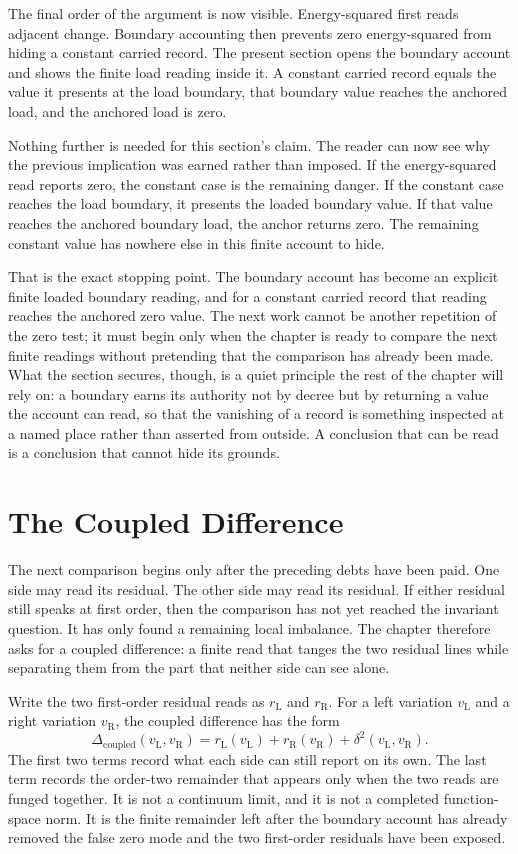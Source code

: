 The final order of the argument is now visible. Energy-squared first reads
adjacent change. Boundary accounting then prevents zero energy-squared from
hiding a constant carried record. The present section opens the boundary
account and shows the finite load reading inside it. A constant carried record
equals the value it presents at the load boundary, that boundary value reaches
the anchored load, and the anchored load is zero.

Nothing further is needed for this section's claim. The reader can now see why
the previous implication was earned rather than imposed. If the energy-squared
read reports zero, the constant case is the remaining danger. If the constant
case reaches the load boundary, it presents the loaded boundary value. If that
value reaches the anchored boundary load, the anchor returns zero. The
remaining constant value has nowhere else in this finite account to hide.

That is the exact stopping point. The boundary account has become an explicit
finite loaded boundary reading, and for a constant carried record that reading
reaches the anchored zero value. The next work cannot be another repetition of
the zero test; it must begin only when the chapter is ready to compare the next
finite readings without pretending that the comparison has already been made.
What the section secures, though, is a quiet principle the rest of the chapter
will rely on: a boundary earns its authority not by decree but by returning a
value the account can read, so that the vanishing of a record is something
inspected at a named place rather than asserted from outside. A conclusion that
can be read is a conclusion that cannot hide its grounds.

\section{The Coupled Difference}

The next comparison begins only after the preceding debts have been paid. One
side may read its residual. The other side may read its residual. If either
residual still speaks at first order, then the comparison has not yet reached
the invariant question. It has only found a remaining local imbalance. The
chapter therefore asks for a coupled difference: a finite read that tanges the
two residual lines while separating them from the part that neither side
can see alone.

Write the two first-order residual reads as
\(r_{\mathrm{L}}\) and \(r_{\mathrm{R}}\). For a left variation
\(v_{\mathrm{L}}\) and a right variation \(v_{\mathrm{R}}\), the coupled
difference has the form
\[
  \Delta_{\mathrm{coupled}}(v_{\mathrm{L}},v_{\mathrm{R}})
    =
  r_{\mathrm{L}}(v_{\mathrm{L}})
  + r_{\mathrm{R}}(v_{\mathrm{R}})
  + \delta^2(v_{\mathrm{L}},v_{\mathrm{R}}).
\]
The first two terms record what each side can still report on its own. The
last term records the order-two remainder that appears only when the two reads
are funged together. It is not a continuum limit, and it is not a completed
function-space norm. It is the finite remainder left after the boundary account
has already removed the false zero mode and the two first-order residuals have
been exposed.


